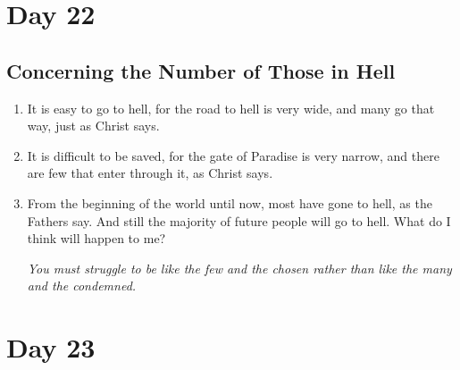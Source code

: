 \documentclass[11pt]{article}
\begin{document}
\section*{Day 22}
\label{sec:orge6300f7}
\subsection*{Concerning the Number of Those in Hell}
\label{sec:orgf2d17f7}
\begin{enumerate}
\item It is easy to go to hell, for the road to hell is very wide, and many go that way, just as Christ says.
\item It is difficult to be saved, for the gate of Paradise is very narrow, and there are few that enter through it, as Christ says.
\item From the beginning of the world until now, most have gone to hell, as the Fathers say. And still the majority of future people will go to hell.
What do I think will happen to me?

\emph{You must struggle to be like the few and the chosen rather than like the many and the condemned.}
\end{enumerate}
\section*{Day 23}
\label{sec:org1fecf89}
\end{document}
